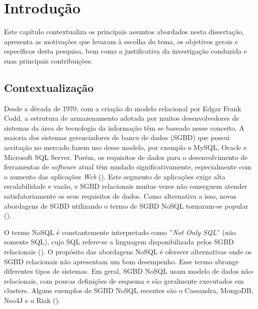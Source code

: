 
\chapter{Introdução}
\label{chp:introduction}


\noindent Este capítulo contextualiza os principais assuntos abordados nesta dissertação, apresenta as motivações que levaram à escolha do tema, os objetivos gerais e específicos desta pesquisa, bem como a justificativa da investigação conduzida e suas principais contribuições.
\clearpage


\section{Contextualização}

Desde a década de 1970, com a criação do modelo relacional por Edgar Frank Codd, a estrutura de armazenamento adotada por muitos desenvolvedores de sistemas da área de tecnologia da informação têm se baseado nesse conceito. A maioria dos sistemas gerenciadores de banco de dados (SGBD) que possui aceitação no mercado fazem uso desse modelo, por exemplo o MySQL, Oracle e Microsoft SQL Server. Porém, os requisitos de dados para o desenvolvimento de ferramentas de \textit{software} atual têm mudado significativamente, especialmente com o aumento das aplicações \textit{Web} (\cite{nasholm:2012}). Este segmento de aplicações exige alta escalabilidade e vazão, e SGBD relacionais muitas vezes não conseguem atender satisfatoriamente os seus requisitos de dados. Como alternativa a isso, novas abordagens de SGBD utilizando o termo de SGBD NoSQL tornaram-se popular (\cite{silva:2016}).

O termo NoSQL é constantemente interpretado como ''\emph{Not Only SQL}'' (não somente SQL), cujo SQL refere-se a linguagem disponibilizada pelos SGBD relacionais (\cite{nasholm:2012}). O propósito das abordagens NoSQL é oferecer alternativas onde os SGBD relacionais não apresentam um bom desempenho. Esse termo abrange diferentes tipos de sistemas. Em geral, SGBD NoSQL usam modelo de dados não-relacionais, com poucas definições de esquema e são geralmente executados em clusters. Alguns exemplos de SGBD NoSQL recentes são o Cassandra, MongoDB, Neo4J e o Riak (\cite{fowler:2013}).

